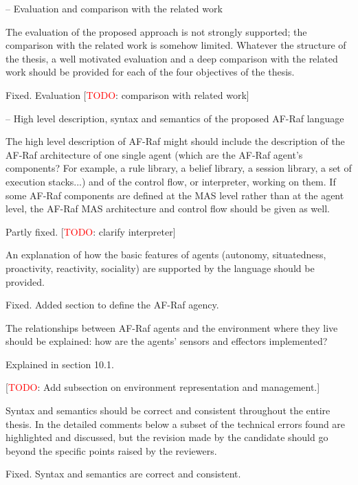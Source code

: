 \documentclass{article}
\newcommand{\todo}[1]{[\textcolor{red}{TODO}: #1]}
\newenvironment{them}{\noindent\begingroup\color{blue}}{\endgroup\par}
\begin{document}
\begin{them}

-- Evaluation and comparison with the related work

The evaluation of the proposed approach is not strongly supported; the
comparison with the related work is somehow limited. Whatever the structure of
the thesis, a well motivated evaluation and a deep comparison with the related
work should be provided for each of the four objectives of the thesis.

\end{them}
Fixed. Evaluation
\todo{comparison with related work}

\begin{them}

-- High level description, syntax and semantics of the proposed AF-Raf language

The high level description of AF-Raf might should include the description of
the AF-Raf architecture of one single agent (which are the AF-Raf agent's
components? For example, a rule library, a belief library, a session library, a
set of execution stacks...) and of the control flow, or interpreter, working on
them. If some AF-Raf components are defined at the MAS level rather than at the
agent level, the AF-Raf MAS architecture and control flow should be given as
well.

\end{them}
Partly fixed.
\todo{clarify interpreter}

\begin{them}

An explanation of how the basic features of agents (autonomy, situatedness,
proactivity, reactivity, sociality) are supported by the language should be
provided. 

\end{them}
Fixed. Added section to define the AF-Raf agency.

\begin{them}

The relationships between AF-Raf agents and the environment where
they live should be explained: how are the agents' sensors and effectors
implemented? 

\end{them}
Explained in section 10.1.

\todo{Add subsection on environment representation and management.}

\begin{them}

Syntax and semantics should be correct and consistent throughout the entire
thesis. In the detailed comments below a subset of the technical errors found
are highlighted and discussed, but the revision made by the candidate should go
beyond the specific points raised by the reviewers.

\end{them}
Fixed. Syntax and semantics are correct and consistent.
\end{document}
